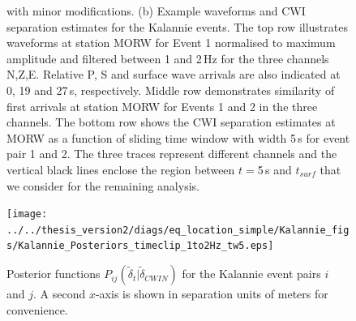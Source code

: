 \documentclass[grl]{agutex}
\begin{document}
\begin{figure}
{\citet{dr_Dawson08a} with minor modifications. (b) Example waveforms and CWI separation estimates
for the Kalannie events. The top row illustrates waveforms at station MORW for Event 1 normalised to maximum
amplitude and filtered between 1 and 2\,Hz for the three channels N,Z,E. Relative P, S and surface wave arrivals are also
indicated at 0, 19 and 27\,s, respectively. Middle row demonstrates similarity of first arrivals at station MORW for Events 1 and 2 in
the three channels. The bottom row shows the CWI separation estimates at MORW
as a function of sliding time window with width 5\,s for event pair 1 and 2. The three traces
represent different channels and the vertical black lines
enclose the region between $t=$5\,s and $t_{surf}$ that we consider for the remaining analysis.}
\label{fig:-Kalannie-map}
\end{figure}


\begin{figure}
\noindent\texttt{[image: ../../thesis\_version2/diags/eq\_location\_simple/Kalannie\_figs/Kalannie\_Posteriors\_timeclip\_1to2Hz\_tw5.eps]}
\caption{Posterior functions $P_{ij}(\widetilde{\delta}_{t}|\widetilde{\delta}_{CWIN})$ for the Kalannie
event pairs $i$ and $j$. A
second $x$-axis is shown in separation units of meters for convenience.}
\label{fig:Kalannie-CWI-Posteriors}
\end{figure}
\end{document}
